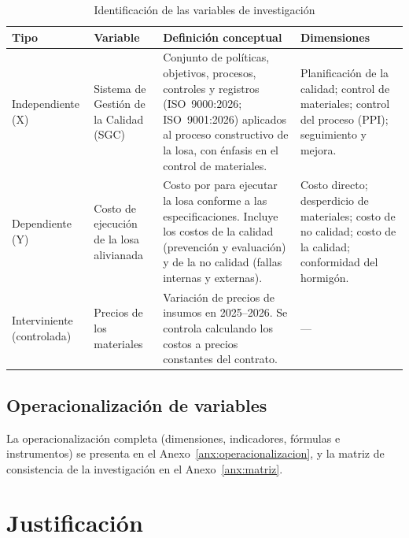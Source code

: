 \begin{table}[H]
\caption{Identificación de las variables de investigación}
\label{tab:variables}
\begin{tabularx}{\linewidth}{@{}P{2.6cm}P{3.1cm}LP{3.5cm}@{}}
\toprule
\textbf{Tipo} & \textbf{Variable} & \textbf{Definición conceptual} & \textbf{Dimensiones} \\
\midrule
Independiente (X) & Sistema de Gestión de la Calidad (SGC) & Conjunto de políticas, objetivos, procesos, controles y registros (ISO~9000:2026; ISO~9001:2026) aplicados al proceso constructivo de la losa, con énfasis en el control de materiales. & Planificación de la calidad; control de materiales; control del proceso (PPI); seguimiento y mejora. \\
\addlinespace
Dependiente (Y) & Costo de ejecución de la losa alivianada & Costo por \mdos{} para ejecutar la losa conforme a las especificaciones. Incluye los costos de la calidad (prevención y evaluación) y de la no calidad (fallas internas y externas). & Costo directo; desperdicio de materiales; costo de no calidad; costo de la calidad; conformidad del hormigón. \\
\addlinespace
Interviniente (controlada) & Precios de los materiales & Variación de precios de insumos en 2025--2026. Se controla calculando los costos a precios constantes del contrato. & --- \\
\bottomrule
\end{tabularx}
\end{table}

\subsection{Operacionalización de variables}
La operacionalización completa (dimensiones, indicadores, fórmulas e instrumentos) se presenta en el Anexo~\ref{anx:operacionalizacion}, y la matriz de consistencia de la investigación en el Anexo~\ref{anx:matriz}.

\section{Justificación}

